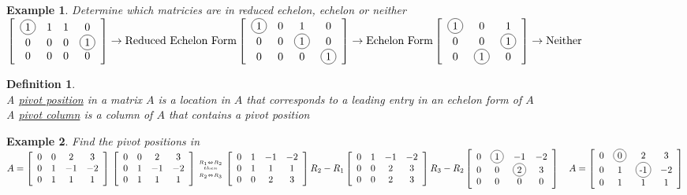 \documentclass[a4paper,12pt,openany]{book}
\newcommand*{\bfrac}[2]{\genfrac{}{}{0pt}{}{#1}{#2}}
\newcommand*\circled[1]{\tikz[baseline=(char.base)]{
            \node[shape=circle,draw,inner sep=2pt] (char) {#1};}}
\theoremstyle{defn}
\newtheorem{defn}{Definition}[section]
\theoremstyle{expl}
\newtheorem{expl}{Example}[section]
\begin{document}
\begin{expl}\textup{
Determine which matricies are in reduced echelon, echelon or neither\\
$\left[\begin{array}{cccc}
\circled{1}&1&1&0\\
0&0&0&\circled{1}\\
0&0&0&0
\end{array}\right]\rightarrow \textup{Reduced Echelon Form}\\
\left[\begin{array}{cccc}
\circled{1}&0&1&0\\
0&0&\circled{1}&0\\
0&0&0&\circled{1}
\end{array}\right]\rightarrow \textup{Echelon Form}\\
\left[\begin{array}{ccc}
\circled{1}&0&1\\
0&0&\circled{1}\\
0&\circled{1}&0
\end{array}\right]\rightarrow \textup{Neither}
$}\end{expl}
\begin{defn}\textup{\-\\
	A \underline{pivot position} in a matrix $A$ is a location in $A$ that corresponds to a leading entry in an echelon form of $A$\\
	A \underline{pivot column} is a column of $A$ that contains a pivot position  
}\end{defn}
\begin{expl}\textup{
Find the pivot positions in $A = \left[\begin{array}{cccc}0&0&2&3\\0&1&-1&-2\\0&1&1&1\end{array}\right]\\
\left[\begin{array}{cccc}0&0&2&3\\0&1&-1&-2\\0&1&1&1\end{array}\right] \bfrac{\bfrac{R_1\Leftrightarrow R_2}{then}}{\bfrac{}{R_2\Leftrightarrow R_3}}\left[\begin{array}{cccc}0&1&-1&-2\\0&1&1&1\\0&0&2&3\end{array}\right]R_2-R_1\left[\begin{array}{cccc}0&1&-1&-2\\0&0&2&3\\0&0&2&3\end{array}\right]\\R_3-R_2\left[\begin{array}{cccc}0&\circled{1}&-1&-2\\0&0&\circled{2}&3\\0&0&0&0\end{array}\right]\quad A = \left[\begin{array}{cccc}0&\circled{0}&2&3\\0&1&\circled{-1}&-2\\0&1&1&1\end{array}\right]
$}\end{expl}
\end{document}
